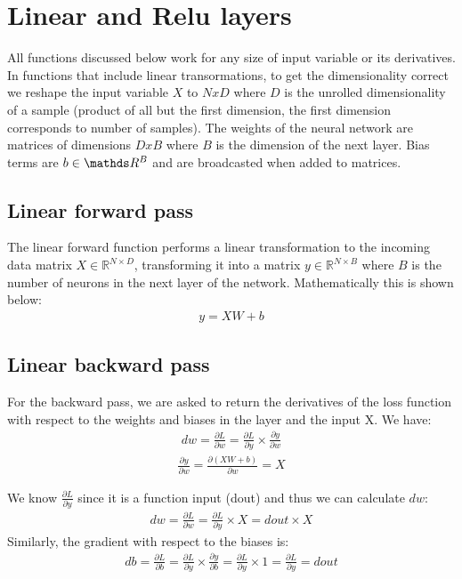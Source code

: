 \documentclass[12pt,twoside]{article}
\begin{document}




\section{Linear and Relu layers}
All functions discussed below work for any size of input variable or its derivatives. In functions that include linear transormations, to get the dimensionality correct we reshape the input variable $X$ to $NxD$ where $D$ is the unrolled dimensionality of a sample (product of all but the first dimension, the first dimension corresponds to number of samples). The weights of the neural network are matrices of dimensions $DxB$ where $B$ is the dimension of the next layer. Bias terms are $b \in \R^B$ and are broadcasted when added to matrices. 
\subsection{Linear forward pass}

The linear forward function performs a linear transformation to the incoming data matrix $X \in \mathbb{R}^{N \times D}$, transforming it into a matrix $y \in \mathbb{R}^{N \times B}$ where $B$ is the number of neurons in the next layer of the network. Mathematically this is shown below:
\begin{align}
y = XW + b
\end{align}

\subsection{Linear backward pass}

For the backward pass, we are asked to return the derivatives of the loss function with respect to the weights and biases in the layer and the input X.
We have:
\begin{align}
dw = \frac{\partial L}{\partial w} = \frac{\partial L}{\partial y} \times \frac{\partial y}{\partial w}
\end{align}
\begin{align*}
\frac{\partial y}{\partial w} = \frac{\partial (XW + b)}{\partial w} = X
\end{align*}

We know $\frac{\partial L}{\partial y}$ since it is a function input (dout) and thus we can calculate $dw$:
\begin{align}
dw = \frac{\partial L}{\partial w} = \frac{\partial L}{\partial y} \times X = dout \times X
\end{align}
Similarly, the gradient with respect to the biases is:
\begin{align*}
db = \frac{\partial L}{\partial b} = \frac{\partial L}{\partial y} \times \frac{\partial y}{\partial b} = \frac{\partial L}{\partial y} \times 1 = \frac{\partial L}{\partial y} = dout
\end{align*}
\end{document}
